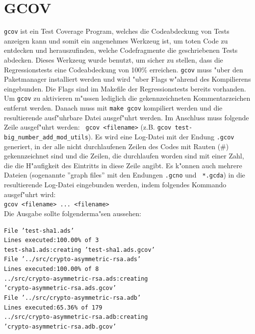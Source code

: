 \section{GCOV}
{\tt gcov} ist ein Test Coverage Program, welches die Codeabdeckung
von Tests anzeigen kann und somit ein angenehmes Werkzeug ist, um
toten Code zu entdecken und herauszufinden, welche Codefragmente die
geschriebenen Tests abdecken.  Dieses Werkzeug wurde benutzt, um
sicher zu stellen, dass die Regressionstests eine Codeabdeckung von
100\% erreichen.  {\tt gcov} muss "uber den Paketmanager installiert
werden und wird "uber Flags w"ahrend des Kompilierens eingebunden.
Die Flags sind im Makefile der Regressionstests bereits vorhanden. Um
{\tt gcov} zu aktivieren m"ussen lediglich die gekennzeichneten
Kommentarzeichen entfernt werden.  Danach muss mit {\tt make gcov}
kompiliert werden und die resultierende ausf"uhrbare Datei ausgef"uhrt
werden.  Im Anschluss muss folgende Zeile ausgef"uhrt werden: {\tt
  gcov <filename>} (z.B. {\tt gcov
  test-big\_number\_add\_mod\_utils}).  Es wird eine Log-Datei mit der
Endung {\tt .gcov} generiert, in der alle nicht durchlaufenen Zeilen
des Codes mit Rauten (\#) gekennzeichnet sind und die Zeilen, die
durchlaufen worden sind mit einer Zahl, die die H"aufigkeit des
Eintritts in diese Zeile angibt.  Es k"onnen auch mehrere Dateien
(sogenannte ''graph files'' mit den Endungen {\tt *.gcno} und {\tt
  *.gcda}) in die resultierende Log-Datei eingebunden werden, indem
folgendes Kommando ausgef"uhrt wird:\\ {\tt gcov <filename>
  ... <filename>}\\ Die Ausgabe sollte folgenderma"sen aussehen:

{\tt File 'test-sha1.ads'\\
Lines executed:100.00\% of 3\\
test-sha1.ads:creating 'test-sha1.ads.gcov'\\

File '../src/crypto-asymmetric-rsa.ads'\\
Lines executed:100.00\% of 8\\
../src/crypto-asymmetric-rsa.ads:creating\\ 'crypto-asymmetric-rsa.ads.gcov'\\

File '../src/crypto-asymmetric-rsa.adb'\\
Lines executed:65.36\% of 179\\
../src/crypto-asymmetric-rsa.adb:creating\\ 'crypto-asymmetric-rsa.adb.gcov'\\}


